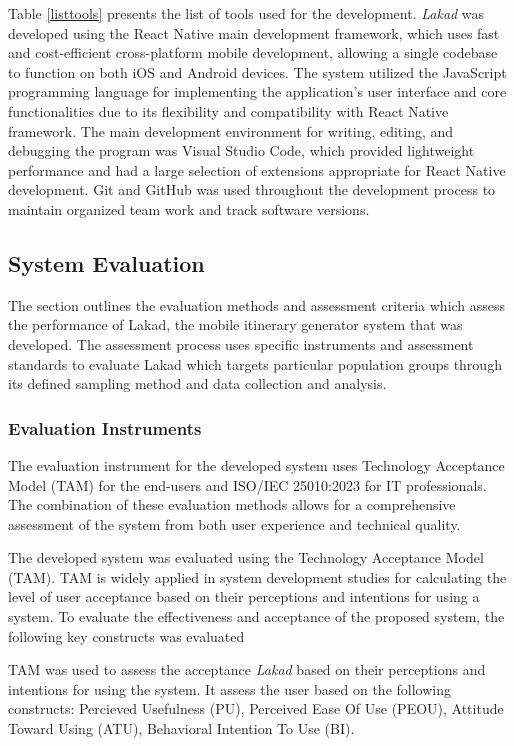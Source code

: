 Table \ref{listtools} presents the list of tools used for the development. \textit{Lakad} was developed using the React Native main development framework, which uses fast and cost-efficient cross-platform mobile development, allowing a single codebase to function on both iOS and Android devices. The system utilized the JavaScript programming language for implementing the application’s user interface and core functionalities due to its flexibility and compatibility with React Native framework. The main development environment for writing, editing, and debugging the program was Visual Studio Code, which provided lightweight performance and had a large selection of extensions appropriate for React Native development. Git and GitHub was used throughout the development process to maintain organized team work and track software versions.

\subsection{System Evaluation}

The section outlines the evaluation methods and assessment criteria which assess the performance of Lakad, the mobile itinerary generator system that was developed. The assessment process uses specific instruments and assessment standards to evaluate Lakad which targets particular population groups through its defined sampling method and data collection and analysis.

\subsubsection{Evaluation Instruments}
The evaluation instrument for the developed system uses Technology Acceptance Model (TAM) for the end-users and ISO/IEC 25010:2023 for IT professionals. The combination of these evaluation methods allows for a comprehensive assessment of the system from both user experience and technical quality. 

The developed system was evaluated using the Technology Acceptance Model (TAM). TAM is widely applied in system development studies for calculating the level of user acceptance based on their perceptions and intentions for using a system. To evaluate the effectiveness and acceptance of the proposed system, the following key constructs was evaluated

TAM was used to assess the acceptance \textit{Lakad} based on their perceptions and intentions for using the system. It assess the user based on the following constructs: Percieved Usefulness (PU), Perceived Ease Of Use (PEOU), Attitude Toward Using (ATU), Behavioral Intention To Use (BI).

